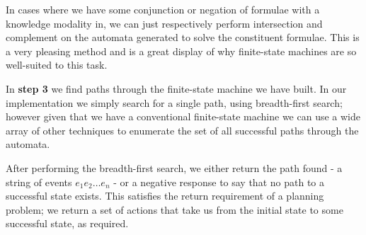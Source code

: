 \documentclass[12pt, a4paper]{article}
\begin{document}
In cases where we have some conjunction or negation of formulae with a knowledge
modality in, we can just respectively perform intersection and complement on the
automata generated to solve the constituent formulae. This is a very pleasing
method and is a great display of why finite-state machines are so well-suited to
this task. 


\bigskip

In \textbf{step 3} we find paths through the finite-state machine we have built.
In our implementation we simply search for a single path, using breadth-first
search; however given that we have a conventional finite-state machine we can
use a wide array of other techniques to enumerate the set of all successful
paths through the automata.

After performing the breadth-first search, we either return the path found - a
string of events $e_1 e_2 \ldots e_n$ - or a negative response to say that no
path to a successful state exists. This satisfies the return requirement of a
planning problem; we return a set of actions that take us from the initial state
to some successful state, as required. 

\end{document}

